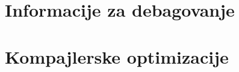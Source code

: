 \documentclass[12pt,oneside]{memoir}
\begin{document}
\section{Informacije za debagovanje}
\label{sec:informacije_za_debagovanje}


\section{Kompajlerske optimizacije}





\end{document}
